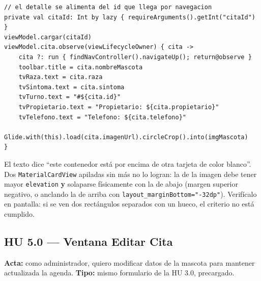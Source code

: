 \documentclass[11pt,letterpaper]{article}
\newcommand{\code}[1]{\texttt{\small #1}}
\begin{document}
\begin{verbatim}
// el detalle se alimenta del id que llega por navegacion
private val citaId: Int by lazy { requireArguments().getInt("citaId") }
viewModel.cargar(citaId)
viewModel.cita.observe(viewLifecycleOwner) { cita ->
    cita ?: run { findNavController().navigateUp(); return@observe }
    toolbar.title = cita.nombreMascota
    tvRaza.text = cita.raza
    tvSintoma.text = cita.sintoma
    tvTurno.text = "#${cita.id}"
    tvPropietario.text = "Propietario: ${cita.propietario}"
    tvTelefono.text = "Telefono: ${cita.telefono}"
    Glide.with(this).load(cita.imagenUrl).circleCrop().into(imgMascota)
}
\end{verbatim}

\begin{notabox}
El texto dice ``este contenedor est\'a por encima de otra tarjeta de color
blanco''. Dos \code{MaterialCardView} apiladas sin m\'as no lo logran: la de la
imagen debe tener mayor \code{elevation} \textbf{y} solaparse f\'isicamente con la
de abajo (margen superior negativo, o anclando la de arriba con
\code{layout\_marginBottom=\allowbreak{}"-32dp"}). Verif\'icalo en pantalla: si se ven dos
rect\'angulos separados con un hueco, el criterio no est\'a cumplido.
\end{notabox}

\subsection{HU 5.0 --- Ventana Editar Cita}

\textbf{Acta:} como administrador, quiero modificar datos de la mascota para
mantener actualizada la agenda. \textbf{Tipo:} mismo formulario de la HU 3.0,
precargado.
\end{document}
